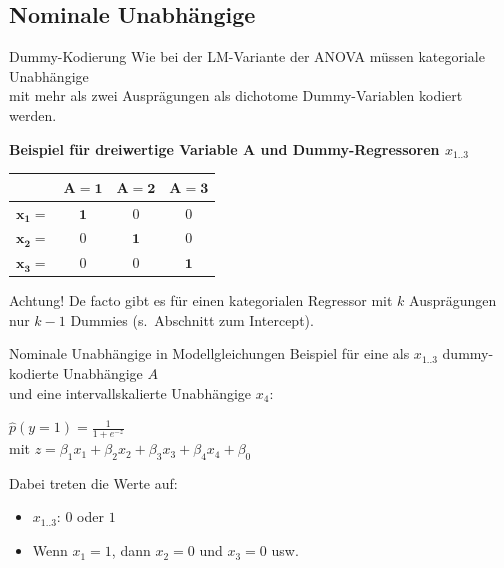 \subsection{Nominale Unabhängige}

\begin{frame}
  {Dummy-Kodierung}
  Wie bei der LM-Variante der ANOVA müssen kategoriale Unabhängige\\
  mit mehr als zwei Ausprägungen als dichotome Dummy-Variablen kodiert werden.\\
  \vspace{0.5cm}

  \pause
  \textbf{Beispiel für dreiwertige Variable A und Dummy-Regressoren $x_{1..3}$}

  \begin{center}
    \begin{tabular}[h!]{|c|c|c|c|}
      \cline{2-4}
      \multicolumn{1}{c|}{} & $\mathbf{A=1}$ & $\mathbf{A=2}$ & $\mathbf{A=3}$ \\
      \hline
      $\mathbf{x_1=}$ & $\mathbf{1}$ & $0$ & $0$ \\
      $\mathbf{x_2=}$ & $0$ & $\mathbf{1}$ & $0$ \\
      $\mathbf{x_3=}$ & $0$ & $0$ & $\mathbf{1}$ \\
      \hline
    \end{tabular}
  \end{center}
  \pause
  Achtung! De facto gibt es für einen kategorialen Regressor mit $k$ Ausprägungen\\
  nur $k-1$ Dummies (s.\ Abschnitt zum Intercept).
\end{frame}

\begin{frame}
  {Nominale Unabhängige in Modellgleichungen}
  Beispiel für eine als $x_{1..3}$ dummy-kodierte Unabhängige $A$\\
  und eine intervallskalierte Unabhängige $x_4$:
  \vspace{0.5cm}
  \pause
  \begin{center}
    $\hat{p}(y=1)=\frac{1}{1+e^{-z}}$\\[3ex]
    mit $z=\beta_1x_1+\beta_2x_2+\beta_3x_3+\beta_4x_4+\beta_0$
  \end{center}
  \pause
  \vspace{0.5cm}
  Dabei treten die Werte auf:
  \begin{itemize}[<+->]
    \item $x_{1..3}$: $0$ oder $1$
    \item Wenn $x_1=1$, dann $x_2=0$ und $x_3=0$ usw.
  \end{itemize}
\end{frame}

